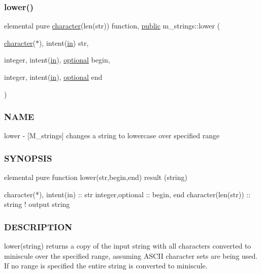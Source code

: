 \subsubsection{\texorpdfstring{lower()}{lower()}}
{\footnotesize\ttfamily elemental pure \hyperlink{option__stopwatch_83_8txt_abd4b21fbbd175834027b5224bfe97e66}{character}(len(str)) function, \hyperlink{M__stopwatch_83_8txt_a2f74811300c361e53b430611a7d1769f}{public} m\+\_\+strings\+::lower (\begin{DoxyParamCaption}\item[{\hyperlink{option__stopwatch_83_8txt_abd4b21fbbd175834027b5224bfe97e66}{character}($\ast$), intent(\hyperlink{M__journal_83_8txt_afce72651d1eed785a2132bee863b2f38}{in})}]{str,  }\item[{integer, intent(\hyperlink{M__journal_83_8txt_afce72651d1eed785a2132bee863b2f38}{in}), \hyperlink{option__stopwatch_83_8txt_aa4ece75e7acf58a4843f70fe18c3ade5}{optional}}]{begin,  }\item[{integer, intent(\hyperlink{M__journal_83_8txt_afce72651d1eed785a2132bee863b2f38}{in}), \hyperlink{option__stopwatch_83_8txt_aa4ece75e7acf58a4843f70fe18c3ade5}{optional}}]{end }\end{DoxyParamCaption})}



\subsubsection*{N\+A\+ME}

lower -\/ \mbox{[}M\+\_\+strings\mbox{]} changes a string to lowercase over specified range 

\subsubsection*{S\+Y\+N\+O\+P\+S\+IS}

\begin{DoxyVerb}elemental pure function lower(str,begin,end) result (string)

 character(*), intent(in) :: str
 integer,optional         :: begin, end
 character(len(str))      :: string  ! output string
\end{DoxyVerb}


\subsubsection*{D\+E\+S\+C\+R\+I\+P\+T\+I\+ON}

lower(string) returns a copy of the input string with all characters converted to miniscule over the specified range, assuming A\+S\+C\+II character sets are being used. If no range is specified the entire string is converted to miniscule.

